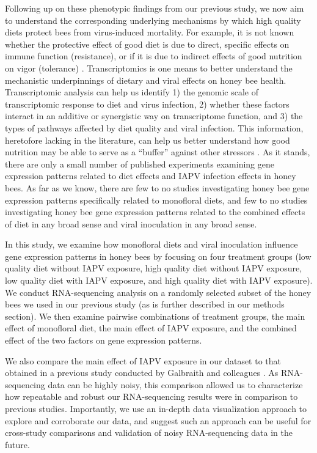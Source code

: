 \documentclass{bmcart}
\begin{document}
\begin{linenumbers}
\begin{doublespacing}
Following up on these phenotypic findings from our previous study, we now aim to understand the corresponding underlying mechanisms by which high quality diets protect bees from virus-induced mortality. For example, it is not known whether the protective effect of good diet is due to direct, specific effects on immune function (resistance), or if it is due to indirect effects of good nutrition on vigor (tolerance) \cite{resTol1}. Transcriptomics is one means to better understand the mechanistic underpinnings of dietary and viral effects on honey bee health. Transcriptomic analysis can help us identify 1) the genomic scale of transcriptomic response to diet and virus infection, 2) whether these factors interact in an additive or synergistic way on transcriptome function, and 3) the types of pathways affected by diet quality and viral infection. This information, heretofore lacking in the literature, can help us better understand how good nutrition may be able to serve as a ``buffer'' against other stressors \cite{AdamTothReview}. As it stands, there are only a small number of published experiments examining gene expression patterns related to diet effects \cite{alaux2} and IAPV infection effects \cite{galbraith} in honey bees. As far as we know, there are few to no studies investigating honey bee gene expression patterns specifically related to monofloral diets, and few to no studies investigating honey bee gene expression patterns related to the combined effects of diet in any broad sense and viral inoculation in any broad sense. 

In this study, we examine how monofloral diets and viral inoculation influence gene expression patterns in honey bees by focusing on four treatment groups (low quality diet without IAPV exposure, high quality diet without IAPV exposure, low quality diet with IAPV exposure, and high quality diet with IAPV exposure). We conduct RNA-sequencing analysis on a randomly selected subset of the honey bees we used in our previous study (as is further described in our methods section). We then examine pairwise combinations of treatment groups, the main effect of monofloral diet, the main effect of IAPV exposure, and the combined effect of the two factors on gene expression patterns.

We also compare the main effect of IAPV exposure in our dataset to that obtained in a previous study conducted by Galbraith and colleagues \cite{galbraith}. As RNA-sequencing data can be highly noisy, this comparison allowed us to characterize how repeatable and robust our RNA-sequencing results were in comparison to previous studies. Importantly, we use an in-depth data visualization approach to explore and corroborate our data, and suggest such an approach can be useful for cross-study comparisons and validation of noisy RNA-sequencing data in the future.


\end{doublespacing}
\end{linenumbers}
\end{document}

